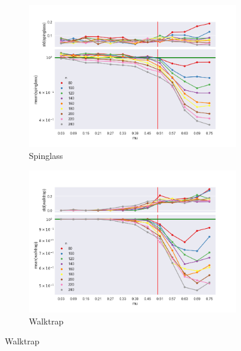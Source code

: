 \begin{figure}
    \begin{subfigure}[b]{0.32\textwidth}
        \includegraphics[width=\textwidth]{fig/ratio_vs_mu_spinglass}
        \caption{Spinglass}
        \label{fig:gull}
    \end{subfigure}
    \qquad
    \begin{subfigure}[b]{0.32\textwidth}
        \includegraphics[width=\textwidth]{fig/ratio_vs_mu_walktrap}
        \caption{Walktrap}
        \label{fig:tiger}
    \end{subfigure}
    

\end{figure}
